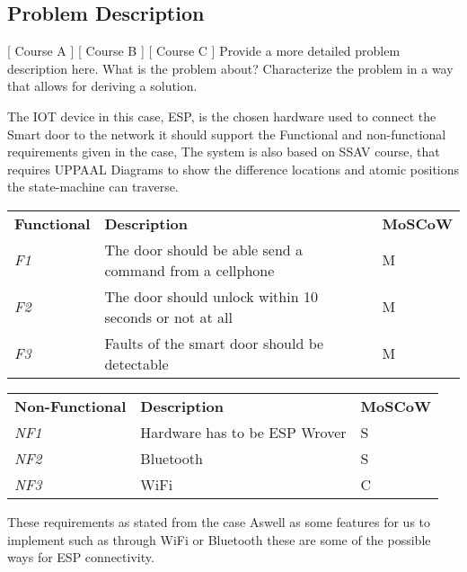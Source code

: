 \subsection{Problem Description}
[ Course A ] [ Course B ] [ Course C ] 
\newline
[ Author A] [ Author B ] [ Author C ] 
\newline
Provide a more detailed problem description here. What is the problem about? Characterize the problem in a way that allows for deriving a solution.

The IOT device in this case, ESP, is the chosen hardware used to connect the Smart door to the network it should support the Functional and non-functional requirements given in the case, The system is also based on SSAV course, that requires UPPAAL Diagrams to show the difference locations and atomic positions the state-machine can traverse. 
\begin{table}[]
    \begin{tabular}{lll}
    \textbf{Functional} & \textbf{Description}                                      & \textbf{MoSCoW} \\
    \textit{F1}         & The door should be able send a   command from a cellphone & M               \\
    \textit{F2}         & The door should unlock within 10   seconds or not at all  & M               \\
    \textit{F3}         & Faults of the smart door should be   detectable           & M              
    \end{tabular}
    \end{table}

    \begin{table}[]
        \begin{tabular}{lll}
        \textbf{Non-Functional} & \textbf{Description}          & \textbf{MoSCoW} \\
        \textit{NF1}            & Hardware has to be ESP Wrover & S               \\
        \textit{NF2}            & Bluetooth                     & S               \\
        \textit{NF3}            & WiFi                          & C              
        \end{tabular}
        \end{table}

These requirements as stated from the case Aswell as some features for us to implement such as through WiFi or Bluetooth these are some of the possible ways for ESP connectivity.
